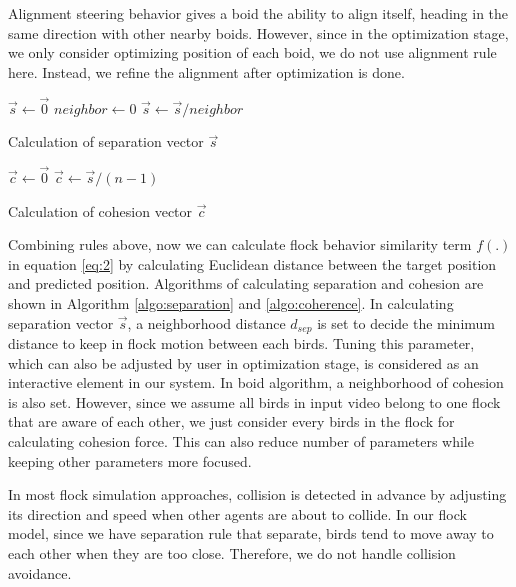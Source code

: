Alignment steering behavior gives a boid the ability to align itself, heading in the same direction with other nearby boids. However, since in the optimization stage, we only consider optimizing position of each boid, we do not use alignment rule here. Instead, we refine the alignment after optimization is done.


\begin{algorithm}[h]
\SetAlgoLined
{}
$\vec{s} \leftarrow \vec{0}$ \;
$neighbor \leftarrow 0 $ \;
$\vec{s} \leftarrow \vec{s} / neighbor$ \;
\caption{Calculation of separation vector $\vec{s}$}
\label{algo:separation}
\end{algorithm}


\begin{algorithm}[h]
\SetAlgoLined
{}
$\vec{c} \leftarrow \vec{0}$ \;
$\vec{c} \leftarrow \vec{s} / (n-1)$ \;
\caption{Calculation of cohesion vector $\vec{c}$}
\label{algo:coherence}
\end{algorithm}


Combining rules above, now we can calculate flock behavior similarity term $f(.)$ in equation \ref{eq:2} by calculating Euclidean distance between the target position and predicted position. Algorithms of calculating separation and cohesion are shown in Algorithm \ref{algo:separation} and \ref{algo:coherence}. In calculating separation vector $\vec{s}$, a neighborhood distance $d_{sep}$ is set to decide the minimum distance to keep in flock motion between each birds. Tuning this parameter, which can also be adjusted by user in optimization stage, is considered as an interactive element in our system. In boid algorithm, a neighborhood of cohesion is also set. However, since we assume all birds in input video belong to one flock that are aware of each other, we just consider every birds in the flock for calculating cohesion force. This can also reduce number of parameters while keeping other parameters more focused.


In most flock simulation approaches, collision is detected in advance by adjusting its direction and speed when other agents are about to collide. In our flock model, since we have separation rule that separate, birds tend to move away to each other when they are too close. Therefore, we do not handle collision avoidance.


